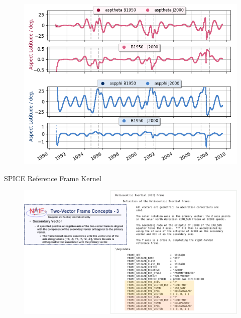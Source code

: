 \documentclass{beamer}
\begin{document}
\begin{frame}{}
\begin{figure}
	\includegraphics[scale=0.7]{Pics/aa_vergleich_all.png}
\end{figure}
\end{frame}

\begin{frame}{SPICE Reference Frame Kernel}
\flushleft
\begin{figure}								
	\includegraphics[width=1.1\textwidth]{Pics/kernel_instruction.png}
\end{figure}
\end{frame}


%
%
\end{document}
